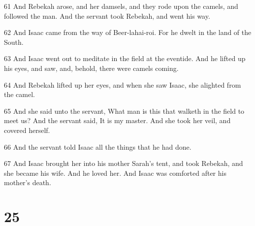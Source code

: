 \par 61 And Rebekah arose, and her damsels, and they rode upon the camels, and followed the man. And the servant took Rebekah, and went his way.
\par 62 And Isaac came from the way of Beer-lahai-roi. For he dwelt in the land of the South.
\par 63 And Isaac went out to meditate in the field at the eventide. And he lifted up his eyes, and saw, and, behold, there were camels coming.
\par 64 And Rebekah lifted up her eyes, and when she saw Isaac, she alighted from the camel.
\par 65 And she said unto the servant, What man is this that walketh in the field to meet us? And the servant said, It is my master. And she took her veil, and covered herself.
\par 66 And the servant told Isaac all the things that he had done.
\par 67 And Isaac brought her into his mother Sarah's tent, and took Rebekah, and she became his wife. And he loved her. And Isaac was comforted after his mother's death.

\chapter{25}

